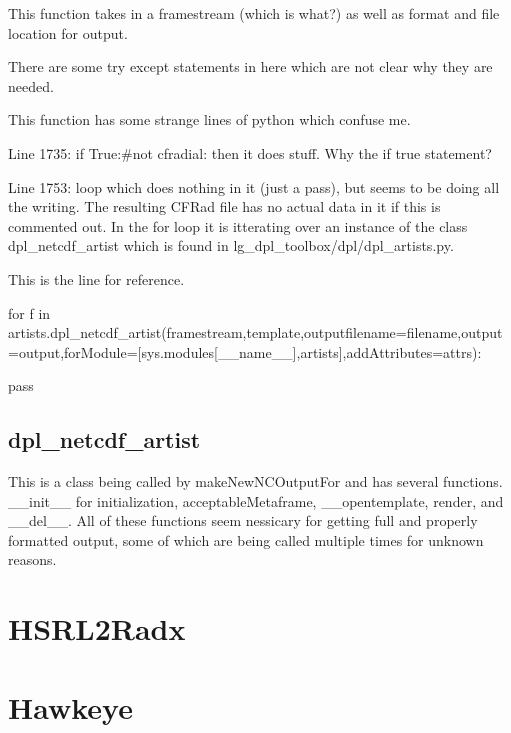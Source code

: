 This function takes in a framestream (which is what?) as well as format and file location for output. 

There are some try except statements in here which are not clear why they are needed. 

This function has some strange lines of python which confuse me. 

Line 1735: if True:\#not cfradial: then it does stuff. Why the if true statement? 

Line 1753: loop which does nothing in it (just a pass), but seems to be doing all the writing. The resulting CFRad file has no actual data in it if this is commented out. In the for loop it is itterating over an instance of the class dpl\_netcdf\_artist which is found in lg\_dpl\_toolbox/dpl/dpl\_artists.py. 

This is the line for reference. 

\noindent for f in artists.dpl\_netcdf\_artist(framestream,template,outputfilename=filename,output=output,forModule=[sys.modules[\_\_name\_\_],artists],addAttributes=attrs):

 pass

\subsection{dpl\_netcdf\_artist}
\label{SECTION-dplnetcdfartist}

This is a class being called by makeNewNCOutputFor and has several functions.  \_\_init\_\_ for initialization, acceptableMetaframe, \_\_opentemplate, render, and \_\_del\_\_. All of these functions seem nessicary for getting full and properly formatted output, some of which are being called multiple times for unknown reasons. 

\section{HSRL2Radx}
\label{SECTION-HSRL2Radx}


\section{Hawkeye}
\label{SECTION-Hawkeye}

\newpage
